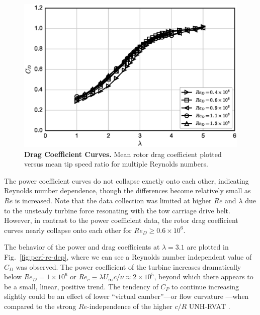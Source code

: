 \documentclass[10pt,letterpaper]{article}
\begin{document}
\begin{figure}[h]
    \includegraphics[width=\textwidth]{figures/cd_curves.eps}

    \caption{{\bf Drag Coefficient Curves.} Mean rotor drag coefficient plotted
    versus mean tip speed ratio for multiple Reynolds numbers.}

    \label{fig:cd-curves}
\end{figure}

The power coefficient curves do not collapse exactly onto each other, indicating
Reynolds number dependence, though the differences become relatively small as
$Re$ is increased. Note that the data collection was limited at higher $Re$ and
$\lambda$ due to the unsteady turbine force resonating with the tow carriage
drive belt. However, in contrast to the power coefficient data, the rotor drag
coefficient curves nearly collapse onto each other for $Re_D \ge 0.6 \times
10^6$.

The behavior of the power and drag coefficients at $\lambda=3.1$ are plotted in
Fig.~\ref{fig:perf-re-dep}, where we can see a Reynolds number independent value
of $C_D$ was observed. The power coefficient of the turbine increases
dramatically below $Re_D = 1 \times 10^6$ or $Re_c \equiv \lambda U_\infty c /
\nu \approx 2 \times 10^5$, beyond which there appears to be a small, linear,
positive trend. The tendency of $C_P$ to continue increasing slightly could be
an effect of lower ``virtual camber''---or flow curvature
\cite{Migliore1980}---when compared to the strong $Re$-independence of the
higher $c/R$ UNH-RVAT \cite{Bachant2015-RVAT-Re-dep}.
\end{document}
